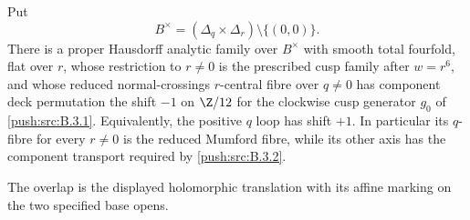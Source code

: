 \begin{proposition}\hypertarget{tag-030M}{}\label{push:src:B.4.18}
\label{push:B418}

Put
\[
 B^\times=(\Delta_q\times\Delta_r)\setminus\{(0,0)\}.
\]
There is a proper Hausdorff analytic family over
$B^\times$ with smooth total fourfold, flat over $r$,
whose restriction to $r\ne0$ is the prescribed
cusp family after $w=r^6$, and whose reduced
normal-crossings $r$-central fibre over $q\ne0$ has
component deck permutation the shift $-1$ on $\Z/12$
for the clockwise cusp generator $g_0$ of \ref{push:src:B.3.1}.
Equivalently, the positive $q$ loop has shift $+1$.
In particular its $q$-fibre for every $r\ne0$ is the
reduced Mumford fibre, while its other axis has
the component transport required by \ref{push:src:B.3.2}.

The overlap is the displayed holomorphic translation with its
affine marking on the two specified base opens.
\end{proposition}



